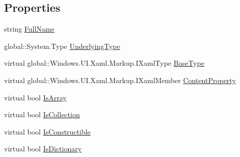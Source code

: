 \subsection*{Properties}
\begin{DoxyCompactItemize}
\item 
string \hyperlink{class_e_l_i_client_1_1_e_l_i_client___xaml_type_info_1_1_xaml_system_base_type_aeac326ffaace7bc0cdb9cf9dc686fcba}{Full\+Name}
\item 
global\+::\+System.\+Type \hyperlink{class_e_l_i_client_1_1_e_l_i_client___xaml_type_info_1_1_xaml_system_base_type_a2514fad2c60cc85820933f6ffc9098a6}{Underlying\+Type}
\item 
virtual global\+::\+Windows.\+U\+I.\+Xaml.\+Markup.\+I\+Xaml\+Type \hyperlink{class_e_l_i_client_1_1_e_l_i_client___xaml_type_info_1_1_xaml_system_base_type_ae8b3f1b089fd0f177fdc8b8ae9c262ec}{Base\+Type}
\item 
virtual global\+::\+Windows.\+U\+I.\+Xaml.\+Markup.\+I\+Xaml\+Member \hyperlink{class_e_l_i_client_1_1_e_l_i_client___xaml_type_info_1_1_xaml_system_base_type_a6bda9a72839d68c0e70d18ef25622afb}{Content\+Property}
\item 
virtual bool \hyperlink{class_e_l_i_client_1_1_e_l_i_client___xaml_type_info_1_1_xaml_system_base_type_a40f8d0ee1083d91b2d14797965fc7307}{Is\+Array}
\item 
virtual bool \hyperlink{class_e_l_i_client_1_1_e_l_i_client___xaml_type_info_1_1_xaml_system_base_type_a9ef85ca4ffae80b134e04c6a6f3804ab}{Is\+Collection}
\item 
virtual bool \hyperlink{class_e_l_i_client_1_1_e_l_i_client___xaml_type_info_1_1_xaml_system_base_type_a9321f79169568fa7479d506d1196ae6f}{Is\+Constructible}
\item 
virtual bool \hyperlink{class_e_l_i_client_1_1_e_l_i_client___xaml_type_info_1_1_xaml_system_base_type_af179aa0690bd8ecca91751ef0c79df88}{Is\+Dictionary}

\end{DoxyCompactItemize}
